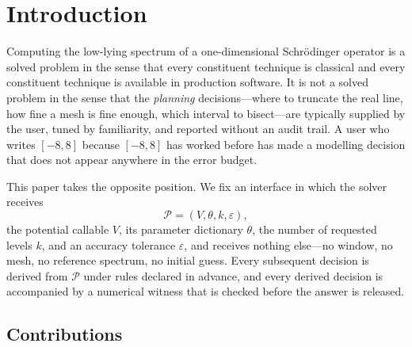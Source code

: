\documentclass[twocolumn,10pt,a4paper]{article}
\theoremstyle{plain}
\theoremstyle{definition}
\newcommand{\eps}{\varepsilon}
\begin{document}
\section{Introduction}
\label{sec:intro}

Computing the low-lying spectrum of a one-dimensional Schr\"odinger operator is
a solved problem in the sense that every constituent technique is classical and
every constituent technique is available in production software. It is not a
solved problem in the sense that the \emph{planning} decisions---where to
truncate the real line, how fine a mesh is fine enough, which interval to
bisect---are typically supplied by the user, tuned by familiarity, and reported
without an audit trail. A user who writes $[-8,8]$ because $[-8,8]$ has worked
before has made a modelling decision that does not appear anywhere in the error
budget.

This paper takes the opposite position. We fix an interface in which the solver
receives
\begin{equation}
\mathcal{P} = (V,\theta,k,\eps),
\end{equation}
the potential callable $V$, its parameter dictionary $\theta$, the number of
requested levels $k$, and an accuracy tolerance $\eps$, and receives nothing
else---no window, no mesh, no reference spectrum, no initial guess. Every
subsequent decision is derived from $\mathcal{P}$ under rules declared in
advance, and every derived decision is accompanied by a numerical witness that
is checked before the answer is released.

\subsection{Contributions}
\end{document}
